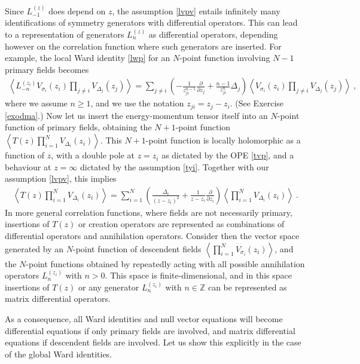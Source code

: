 \documentclass[12pt, a4paper, notitlepage, twoside]{report}
\numberwithin{equation}{section}
\theoremstyle{break}
\begin{document}
Since $L_{-1}^{(z)}$ does depend on $z$, the assumption \eqref{lvpv} entails infinitely many identifications of symmetry generators with differential operators.
This can lead to a representation of generators $L_n^{(z)}$ as differential operators, depending however on the correlation function where such generators are inserted.
For example, the local Ward identity \eqref{lwp} for an $N$-point function involving $N-1$ primary fields becomes
\begin{align}
 \boxed{\left\langle L_{-n}^{(z_i)}V_{\sigma_i}(z_i)\prod_{j\neq i} V_{\Delta_j}(z_j) \right\rangle =
\sum_{j\neq i} \left(-\frac{1}{z_{ji}^{n-1}} {\frac{\partial}{\partial z_j}}  + \frac{n-1}{z_{ji}^n} \Delta_j\right)
\left\langle V_{\sigma_i}(z_i)\prod_{j\neq i} V_{\Delta_j}(z_j) \right\rangle} \ ,
\label{lmn}
\end{align}
where we assume $n\geq 1$, and we use the notation $z_{ji}=z_j-z_i$. (See Exercise \ref{exodma}.)
Now let us insert the energy-momentum tensor itself into an $N$-point function of primary fields, obtaining the $N+1$-point function $
\left\langle T(z) \prod_{i=1}^N V_{\Delta_i}(z_i)\right\rangle$.
This $N+1$-point function is locally holomorphic as a function of $z$, with a double pole at $z=z_i$ as dictated by the OPE \eqref{tvp}, and a behaviour at $z=\infty$ dictated by the assumption \eqref{tyi}.
Together with our assumption \eqref{lvpv}, this implies 
\begin{align}
 \boxed{\left\langle T(z) \prod_{i=1}^N V_{\Delta_i}(z_i)\right\rangle = \sum_{i=1}^N \left(\frac{\Delta_i}{(z-z_i)^2} + \frac{1}{z-z_i}{\frac{\partial}{\partial z_i}}\right)\left\langle  \prod_{i=1}^N V_{\Delta_i}(z_i)\right\rangle }\ .
\label{dtz}
\end{align}
In more general correlation functions, where fields are not necessarily primary, insertions of $T(z)$ or creation operators are represented as combinations of differential operators and annihilation operators.
Consider then the vector space generated by an $N$-point function of descendent fields $\left\langle \prod_{i=1}^NV_{\sigma_i}(z_i)\right\rangle$, and the $N$-point functions obtained by repeatedly acting with all possible annihilation operators $L_n^{(z_i)}$ with $n>0$.
This space is finite-dimensional, and in this space insertions of $T(z)$ or 
any generator $L_n^{(z_i)}$ with $n\in {\mathbb{Z}}$ can be represented as matrix differential operators. 

As a consequence, all Ward identities and null vector equations will become differential equations if only primary fields are involved, and matrix differential equations if descendent fields are involved.
Let us show this explicitly in the case of the global Ward identities.
\end{document}
